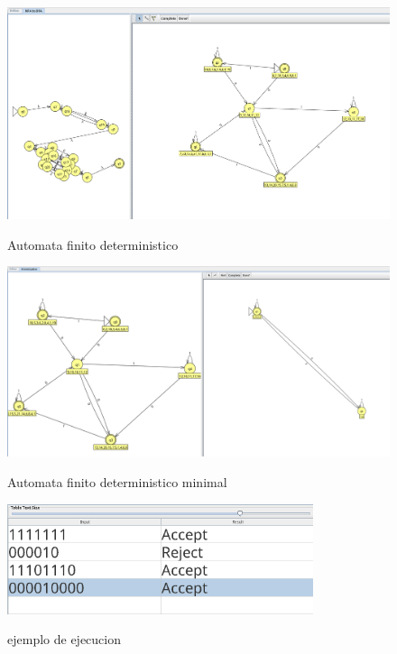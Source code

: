 \documentclass{article}
\begin{document}
        \newpage

        \begin{figure}[!h]
            \centering
            \includegraphics[width=1.2\textwidth]{./Imagenes/image15.png}
            \label{fig:label4}
            \caption{Automata finito  deterministico}
        \end{figure}

        \begin{figure}[!h]
            \centering
            \includegraphics[width=1.2\textwidth]{./Imagenes/image16.png}
            \label{fig:label4}
            \caption{Automata finito deterministico minimal}
        \end{figure}

        \newpage
        \begin{figure}[!h]
            \centering
            \includegraphics[width=0.8\textwidth]{./Imagenes/image17.png}
            \label{fig:label4}
            \caption{ejemplo de ejecucion}
        \end{figure}
\end{document}
